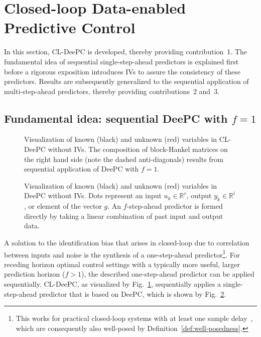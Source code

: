 \section{Closed-loop Data-enabled Predictive Control}\label{sec:CL-DeePC}
\noindent In this section, \ac{CL-DeePC} is developed, thereby providing contribution~1. The fundamental idea of sequential single-step-ahead predictors is explained first before a rigorous exposition introduces \ac{IVs} to assure the consistency of these predictors. Results are subsequently generalized to the sequential application of multi-step-ahead predictors, thereby providing contributions~2 and~3.

\subsection{Fundamental idea: sequential \ac{DeePC} with $f=1$}
\begin{figure}[b!]
\centering

\caption{Visualization of known (black) and unknown (red) variables in \ac{CL-DeePC} without \ac{IVs}. The composition of block-Hankel matrices on the right hand side (note the dashed anti-diagonals) results from sequential application of \ac{DeePC} with $f=1$.}
\label{fig:CL-DeePC}
\end{figure}
\begin{figure}[b!]
\centering

\caption{Visualization of known (black) and unknown (red) variables in \ac{DeePC} without \ac{IVs}. Dots represent an input $u_k\in\mathbb{R}^r$, output $y_k\in\mathbb{R}^l$, or element of the vector $g$. An $f$-step-ahead predictor is formed directly by taking a linear combination of past input and output data.}
\label{fig:regular-DeePC}
\end{figure}
\noindent A solution to the identification bias that arises in closed-loop due to correlation between inputs and noise %
is the synthesis of a one-step-ahead predictor\footnote{This works for practical closed-loop systems with at least one sample delay~\citep{Ljung1996}, which are consequently also well-posed by Definition~\ref{def:well-posedness}.}. For receding horizon optimal control settings with a typically more useful, larger prediction horizon ($f>1$), the described one-step-ahead predictor can be applied sequentially. \ac{CL-DeePC}, as visualized by Fig.~\ref{fig:CL-DeePC}, sequentially applies a single-step-ahead predictor that is based on \ac{DeePC}, which is shown by Fig.~\ref{fig:regular-DeePC}.


